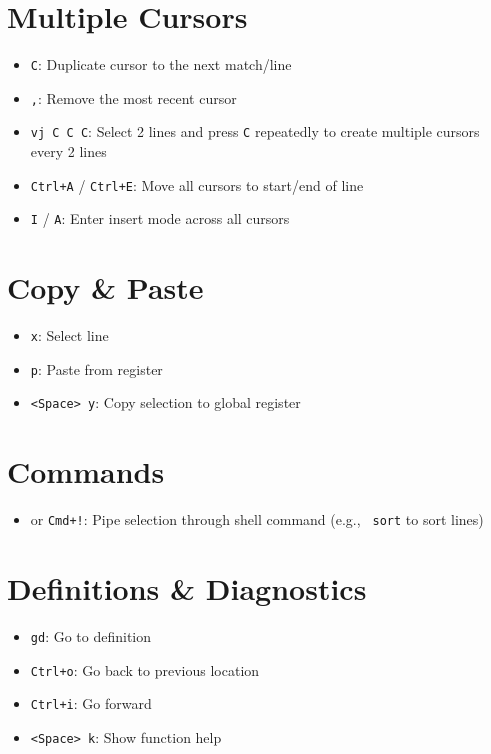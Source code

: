 \documentclass[
  letterpaper,
  DIV=11,
  numbers=noendperiod]{scrartcl}
\providecommand{\tightlist}{%
  \setlength{\itemsep}{0pt}\setlength{\parskip}{0pt}}\usepackage{longtable,booktabs,array}
\begin{document}
\section{Multiple Cursors}\label{multiple-cursors}

\begin{itemize}
\tightlist
\item
  \texttt{C}: Duplicate cursor to the next match/line
\item
  \texttt{,}: Remove the most recent cursor
\item
  \texttt{vj\ C\ C\ C}: Select 2 lines and press \texttt{C} repeatedly
  to create multiple cursors every 2 lines
\item
  \texttt{Ctrl+A} / \texttt{Ctrl+E}: Move all cursors to start/end of
  line
\item
  \texttt{I} / \texttt{A}: Enter insert mode across all cursors
\end{itemize}

\section{Copy \& Paste}\label{copy-paste}

\begin{itemize}
\tightlist
\item
  \texttt{x}: Select line
\item
  \texttt{p}: Paste from register
\item
  \texttt{\textless{}Space\textgreater{}\ y}: Copy selection to global
  register
\end{itemize}

\section{Commands}\label{commands}

\begin{itemize}
\tightlist
\item
  \texttt{\textbar{}} or \texttt{Cmd+!}: Pipe selection through shell
  command (e.g., \texttt{\textbar{}\ sort} to sort lines)
\end{itemize}

\section{Definitions \& Diagnostics}\label{definitions-diagnostics}

\begin{itemize}
\tightlist
\item
  \texttt{gd}: Go to definition
\item
  \texttt{Ctrl+o}: Go back to previous location
\item
  \texttt{Ctrl+i}: Go forward
\item
  \texttt{\textless{}Space\textgreater{}\ k}: Show function help
\end{itemize}
\end{document}
